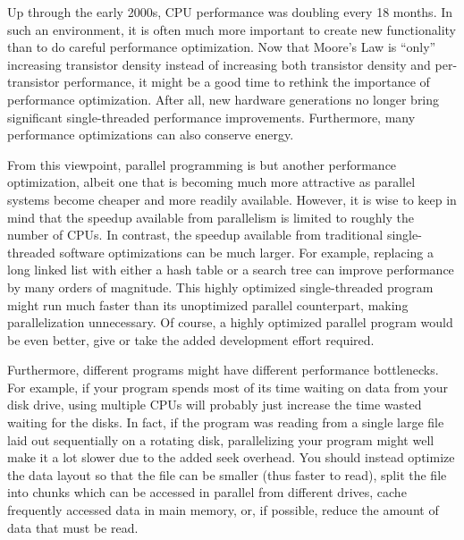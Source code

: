 Up through the early 2000s, CPU performance was doubling every 18 months.
In such an environment, it is often much more important to create new
functionality than to do careful performance optimization.
Now that Moore's Law is ``only'' increasing transistor density instead
of increasing both transistor density and per-transistor performance,
it might be a good time to rethink the importance of performance
optimization.
After all, new hardware generations no longer bring significant
single-threaded performance improvements.
Furthermore, many performance optimizations can also conserve energy.

From this viewpoint, parallel programming is but another performance
optimization, albeit one that is becoming much more attractive
as parallel systems become cheaper and more readily available.
However, it is wise to keep in mind that the speedup available from
parallelism is limited to roughly the number of CPUs.
In contrast, the speedup available from traditional single-threaded
software optimizations can be much larger.
For example, replacing a long linked list with either a hash table
or a search tree can improve performance by many orders of magnitude.
This highly optimized single-threaded program might run much
faster than its unoptimized parallel counterpart, making parallelization
unnecessary.
Of course, a highly optimized parallel program would be even better,
give or take the added development effort required.

Furthermore, different programs might have different performance
bottlenecks.
For example, if your program spends most of its time
waiting on data from your disk drive,
using multiple CPUs will probably just increase the time wasted waiting
for the disks.
In fact, if the program was reading from a single large file laid out
sequentially on a rotating disk, parallelizing your program might
well make it a lot slower due to the added seek overhead.
You should instead optimize the data layout so that
the file can be smaller (thus faster to read), split the file into chunks
which can be accessed in parallel from different drives, 
cache frequently accessed data in main memory,
or, if possible,
reduce the amount of data that must be read.

